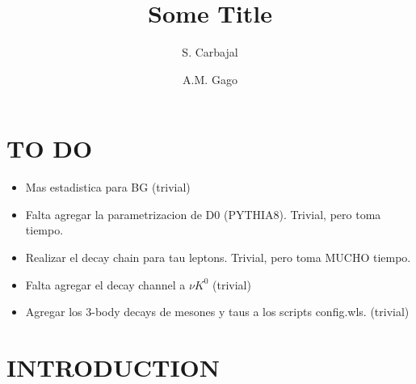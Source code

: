 \documentclass[aps,prd,twocolumn,superscriptaddress,amsmath,amssymb]{revtex4}
\begin{document}
\title{Some Title}
\author{S. Carbajal}
\author{A.M. Gago}

\begin{abstract}
\lipsum[1]
\end{abstract}

\maketitle

\section{TO DO}
\begin{itemize}
\item Mas estadistica para BG (trivial)
\item Falta agregar la parametrizacion de D0 (PYTHIA8). Trivial, pero toma tiempo.
\item Realizar el decay chain para tau leptons. Trivial, pero toma MUCHO tiempo.
\item Falta agregar el decay channel a $\nu K^0$ (trivial)
\item Agregar los 3-body decays de mesones y taus a los scripts config.wls. (trivial)
\end{itemize}
\section{INTRODUCTION}
\lipsum[1]
\end{document}

